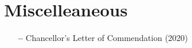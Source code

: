 \section{Miscelleaneous}
\begin{itemize}[leftmargin=10pt, noitemsep]
	\item[\textbf{--}] Chancellor's Letter of Commendation
		(2020)
\end{itemize}
